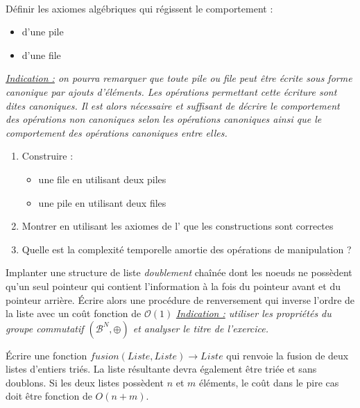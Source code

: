 \documentclass[../../../main.tex]{subfiles}
\begin{document}
\\
Définir les axiomes algébriques qui régissent le comportement :
\begin{itemize}
	\item d'une pile
	\item d'une file
\end{itemize}
\textit{\underline{Indication :} on pourra remarquer que toute pile ou file peut être écrite sous forme canonique par ajouts d'éléments. Les opérations permettant cette écriture sont dites canoniques. Il est alors nécessaire et suffisant de décrire le comportement des opérations non canoniques selon les opérations canoniques ainsi que le comportement des opérations canoniques entre elles.}

\begin{enumerate}
	\item Construire :
	\begin{itemize}
		\item une file en utilisant deux piles
		\item une pile en utilisant deux files
	\end{itemize}
	\item Montrer en utilisant les axiomes de l' que les constructions sont correctes
	\item Quelle est la complexité temporelle amortie des opérations de manipulation ?
\end{enumerate}

 Implanter une structure de liste \textit{doublement} chaînée dont les noeuds ne possèdent qu'un seul pointeur qui contient l'information à la fois du pointeur avant et du pointeur arrière. Écrire alors une procédure de renversement qui inverse l'ordre de la liste avec un coût fonction de $\mathcal{O}(1)$ \newline
\textit{\underline{Indication :} utiliser les propriétés du groupe commutatif $(\mathcal{B}^N, \oplus)$ et analyser le titre de l'exercice.}

 Écrire une fonction $fusion(Liste, Liste) \rightarrow Liste$ qui renvoie la fusion de deux listes d'entiers triés. La liste résultante devra également être triée et sans doublons. Si les deux listes possèdent $n$ et $m$ éléments, le coût dans le pire cas doit être fonction de $O(n + m)$.
\end{document}
